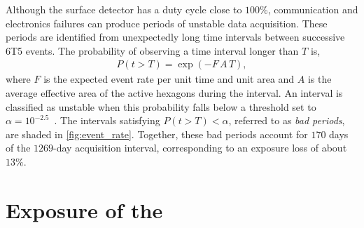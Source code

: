 \documentclass[main.tex]{subfiles}
\begin{document}
Although the surface detector has a duty cycle close to $100\%$, communication and electronics failures can produce periods of unstable data acquisition.
These periods are identified from unexpectedly long time intervals between successive 6T5 events.
The probability of observing a time interval longer than $T$ is,
\begin{align}
    P(t>T)=\exp(-F\,A \,T),
\end{align}
where $F$ is the expected event rate per unit time and unit area and $A$ is the average effective area of the active hexagons during the interval.
An interval is classified as unstable when this probability falls below a threshold set to $\alpha=10^{-2.5}$~\cite{GAP:Gonzalez:2022:Exposure}.
The intervals satisfying $P(t>T)<\alpha$, referred to as \textit{bad periods}, are shaded in \cref{fig:event_rate}.
Together, these bad periods account for $170$ days of the $1269$-day acquisition interval, corresponding to an exposure loss of about $13\%$.


\section{Exposure of the }
\label{sec:exposure}
\end{document}

